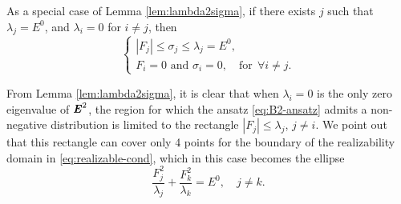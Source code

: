 \begin{remark}
As a special case of Lemma \ref{lem:lambda2sigma}, if there exists $j$ such that 
$\lambda_j = E^0$, and $\lambda_i = 0$ for $i \not= j$, then 
  \[
    \left\{
      \begin{array}{l}
        |F_j| \leq \sigma_j \leq \lambda_j = E^0, \\
        F_i=0 \text{ and } \sigma_i = 0,\quad\text{for}~~\forall i \not= j. 
      \end{array}\right.
    \]
  \end{remark}
From Lemma \ref{lem:lambda2sigma}, it is clear that when $\lambda_i = 0$ is the only zero
eigenvalue of $\boldsymbol{\mathit{E}}^2$, the region for which the ansatz \eqref{eq:B2-ansatz} 
admits a non-negative distribution is limited to the rectangle $|F_j| \leq \lambda_j$,
$j\not=i$. We point out that this rectangle can cover only 4 points for the boundary of
the realizability domain in \eqref{eq:realizable-cond}, which in this case 
becomes the ellipse
\[
  \dfrac{F_j^2}{\lambda_j} + \dfrac{F_k^2}{\lambda_k} = E^0,
  \quad j \not= k.
\]


